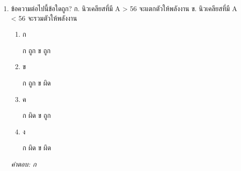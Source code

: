 \documentclass[12pt]{article}
\begin{document}
\begin{enumerate}[label=\arabic*., itemsep=0.5\baselineskip, topsep=0.5\baselineskip, leftmargin=*]
\item ข้อความต่อไปนี้ข้อใดถูก? ก. นิวเคลียสที่มี A > 56 จะแตกตัวให้พลังงาน ข. นิวเคลียสที่มี A < 56 จะรวมตัวให้พลังงาน
\begin{enumerate}[label=\alph*)., itemsep=0.3\baselineskip, topsep=0.3\baselineskip]
\item ก\ 
\begin{minipage}[t]{0.9\linewidth}
\raggedright ก ถูก ข ถูก
\end{minipage}
\item ข\ 
\begin{minipage}[t]{0.9\linewidth}
\raggedright ก ถูก ข ผิด
\end{minipage}
\item ค\ 
\begin{minipage}[t]{0.9\linewidth}
\raggedright ก ผิด ข ถูก
\end{minipage}
\item ง\ 
\begin{minipage}[t]{0.9\linewidth}
\raggedright ก ผิด ข ผิด
\end{minipage}
\end{enumerate}
\vspace{-0.3\baselineskip}
\begin{small}
\textit{คำตอบ: ก}
\end{small}

\end{enumerate}
\end{document}
